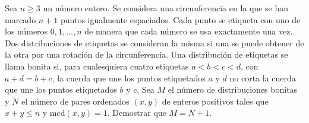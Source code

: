 Sea $n \geq 3$ un número entero. Se considera una circunferencia en la que se han marcado $n + 1$ puntos igualmente espaciados. Cada punto se etiqueta con uno de los números $0, 1, \dots, n$ de manera que cada número se usa exactamente una vez. Dos distribuciones de etiquetas se consideran la misma si una se puede obtener de la otra por una rotación de la circunferencia. Una distribución de etiquetas se llama bonita si, para cualesquiera cuatro etiquetas $a \lt b \lt c \lt d$, con $a + d = b + c$, la cuerda que une los puntos etiquetados $a$ y $d$ no corta la cuerda que une los puntos etiquetados $b$ y $c$. \newline 
Sea $M$ el número de distribuciones bonitas y $N$ el número de pares ordenados $(x,y)$ de enteros positivos tales que $x + y \leq n$ y $\text{mcd} (x, y) = 1$.  \newline 
Demostrar que $M=N+1$.